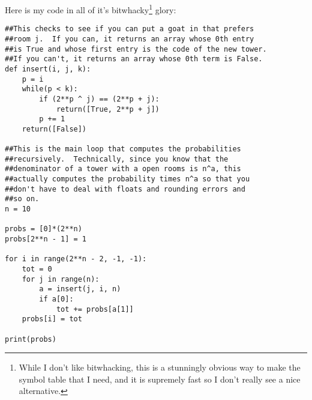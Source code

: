 \documentclass[11pt]{article}
\theoremstyle{definition}
\begin{document}
Here is my code in all of it's bitwhacky\footnote{While I don't like bitwhacking, this is a stunningly obvious way to make the symbol table that I need, and it is supremely fast so I don't really see a nice alternative.} glory:
\begin{verbatim}
##This checks to see if you can put a goat in that prefers
##room j.  If you can, it returns an array whose 0th entry
##is True and whose first entry is the code of the new tower.
##If you can't, it returns an array whose 0th term is False.
def insert(i, j, k):
    p = i
    while(p < k):
        if (2**p ^ j) == (2**p + j):
            return([True, 2**p + j])
        p += 1
    return([False])

##This is the main loop that computes the probabilities
##recursively.  Technically, since you know that the
##denominator of a tower with a open rooms is n^a, this
##actually computes the probability times n^a so that you
##don't have to deal with floats and rounding errors and
##so on.
n = 10

probs = [0]*(2**n)
probs[2**n - 1] = 1

for i in range(2**n - 2, -1, -1):
    tot = 0
    for j in range(n):
        a = insert(j, i, n)
        if a[0]:
            tot += probs[a[1]]
    probs[i] = tot

print(probs)
\end{verbatim}
\end{document}
